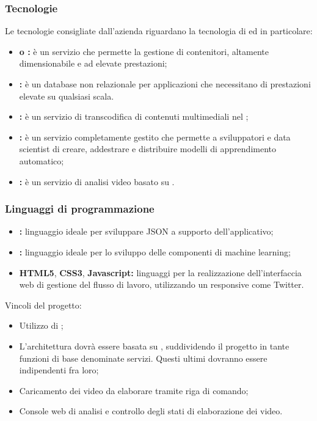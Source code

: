     \subsubsection{Tecnologie}
    Le tecnologie consigliate dall'azienda riguardano la tecnologia di  ed in particolare:
    \begin{itemize}
        \item \textbf{ o : }è un servizio che permette la gestione di contenitori, altamente dimensionabile e ad elevate prestazioni;
        \item \textbf{: }è un database non relazionale per applicazioni che necessitano di prestazioni elevate su qualsiasi scala.
        \item \textbf{: }è un servizio di transcodifica di contenuti multimediali nel ;
        \item \textbf{: } è un servizio completamente gestito che permette a sviluppatori e data scientist di creare, addestrare e distribuire modelli di apprendimento automatico;
        \item \textbf{: } è un servizio di analisi video basato su .
    \end{itemize}
        \subsubsection{Linguaggi di programmazione}
        \begin{itemize}
            \item \textbf{: }linguaggio ideale per sviluppare  JSON a supporto dell'applicativo;
            \item \textbf{: }linguaggio ideale per lo sviluppo delle componenti di machine learning;
            \item \textbf{HTML5}, \textbf{CSS3}, \textbf{Javascript: }linguaggi per la realizzazione dell'interfaccia web di gestione del flusso di lavoro, utilizzando un  responsive come Twitter.
        \end{itemize}
    Vincoli del progetto:
    \begin{itemize}
        \item Utilizzo di ;
        \item L'architettura dovrà essere basata su , suddividendo il progetto in tante funzioni di base denominate servizi. Questi ultimi dovranno essere indipendenti fra loro;
        \item Caricamento dei video da elaborare tramite riga di comando;
        \item Console web di analisi e controllo degli stati di elaborazione dei video.
      \end{itemize}
    
